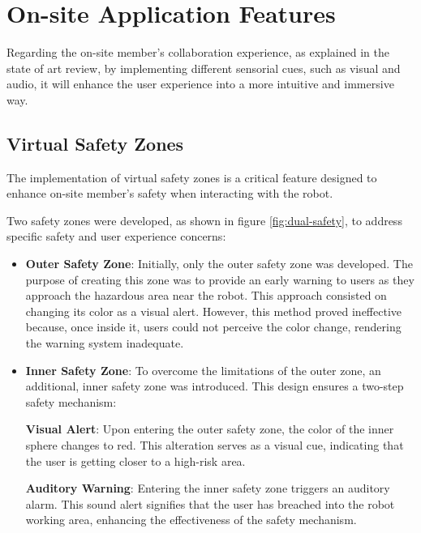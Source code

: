 \section{On-site Application Features}
\label{section:on-site-features}
Regarding the on-site member's collaboration experience, as explained in the state of art review, by implementing different sensorial cues, such as visual and audio, it will enhance the user experience into a more intuitive and immersive way.
    
    \subsection{Virtual Safety Zones}
    \label{subsection:virtual-safety-zones} 

        The implementation of virtual safety zones is a critical feature designed to enhance on-site member's safety when interacting with the robot. 

        Two safety zones were developed, as shown in figure \ref{fig:dual-safety}, to address specific safety and user experience concerns:

        \begin{itemize}
            \item \textbf{Outer Safety Zone}: Initially, only the outer safety zone was developed. The purpose of creating this zone was to provide an 
            early warning to users as they approach the hazardous area near the robot. This approach consisted on changing its color as a visual alert. 
            However, this method proved ineffective because, once inside it, users could not perceive the color change, rendering the warning system inadequate.
            
            \item \textbf{Inner Safety Zone}: To overcome the limitations of the outer zone, an additional, inner safety zone was introduced. 
            This design ensures a two-step safety mechanism:

                \textbf{Visual Alert}: Upon entering the outer safety zone, the color of the inner sphere changes to red. 
                This alteration serves as a visual cue, indicating that the user is getting closer to a high-risk area.

                \textbf{Auditory Warning}: Entering the inner safety zone triggers an auditory alarm. This sound alert signifies that the user has 
                breached into the robot working area, enhancing the effectiveness of the safety mechanism.
        \end{itemize}

